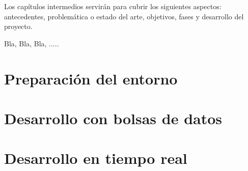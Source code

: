 
Los capítulos intermedios servirán para cubrir los siguientes aspectos:
antecedentes, problemática o estado del arte, objetivos, fases y desarrollo del proyecto.

Bla, Bla, Bla, .....


\section{Preparación del entorno}
\label{4:sec1}




\section{Desarrollo con bolsas de datos}
\label{4:sec2}




\section{Desarrollo en tiempo real}
\label{4:sec3}



